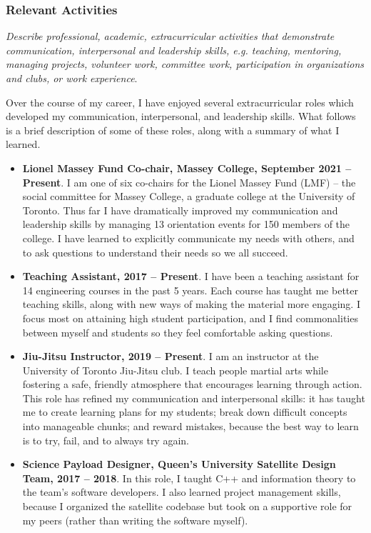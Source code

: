 \documentclass[a4paper,12pt]{article}
\begin{document}
\subsubsection*{Relevant Activities}
\textit{Describe professional, academic, extracurricular activities that
    demonstrate communication, interpersonal and leadership skills, e.g.
    teaching, mentoring, managing projects, volunteer work, committee work,
participation in organizations and clubs, or work experience}.

Over the course of my career, I have enjoyed several extracurricular roles which
developed my communication, interpersonal, and leadership skills.
What follows is a brief description of some of these roles, along with a summary
of what I learned.
\begin{itemize}
\item \textbf{Lionel Massey Fund Co-chair, Massey College, September 2021 -- Present}.
    I am one of six co-chairs for the Lionel Massey Fund (LMF) -- the social
    committee for Massey College, a graduate college at the University of
    Toronto. Thus far I have dramatically improved my
    communication and leadership skills by managing 13 orientation events for
    150 members of the college. I have learned to explicitly communicate my needs
    with others, and to ask questions to understand their needs so we all succeed.

\item \textbf{Teaching Assistant, 2017 -- Present}.
    I have been a teaching assistant for 14 engineering courses in the past 5 years.
    Each course has taught me better teaching skills, along with new ways of
    making the material more engaging.
    I focus most on attaining high student participation, and I find
    commonalities between myself and students so they feel comfortable asking
    questions. 

\item \textbf{Jiu-Jitsu Instructor, 2019 -- Present}. 
    I am an instructor at the University of Toronto Jiu-Jitsu club. I teach
    people martial arts while fostering a safe, friendly atmosphere that
    encourages learning through action.
    This role has refined my communication and interpersonal skills:
    it has taught me to create learning plans for my students;
    break down difficult concepts into manageable chunks; 
    and reward mistakes, because the best way to learn is to try, fail, and
    to always try again.

\item \textbf{Science Payload Designer, Queen’s University Satellite Design
    Team, 2017 -- 2018}. 
    In this role, I taught C++ and information theory to the team’s software
    developers. I also learned project management skills, because I organized
    the satellite codebase but took on a supportive role for my peers (rather
    than writing the software myself).


\end{itemize}
\end{document}

